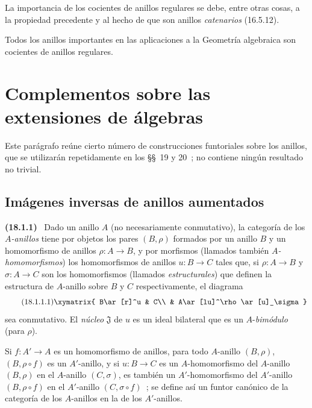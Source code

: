 \documentclass[10pt,oneside]{book}
\makeatletter
\newcommand{\setmanualcurrentlabel}[1]{\def\@currentlabel{#1}}
\newcommand{\oldpage}[2][]{%
  \setcounter{footnote}{0}%
  \marginpar{\scriptsize\textbf{#1}~|~#2}\ignorespaces}
\newenvironment{env}[1][]{\setmanualcurrentlabel{#1}\par\medskip\noindent\textbf{(#1)}\ }{\par}
\makeatother
\begin{document}
La importancia de los cocientes de anillos regulares se debe, entre otras
cosas, a la propiedad precedente y al hecho de que son anillos
\emph{catenarios} (16.5.12).

Todos los anillos importantes en las aplicaciones a la Geometría algebraica
son cocientes de anillos regulares.

\section{Complementos sobre las extensiones de álgebras}
\label{section:0.18-es}

Este parágrafo reúne cierto número de construcciones funtoriales sobre
los anillos, que se utilizarán repetidamente en los \S\S~19 y 20~; no
contiene ningún resultado no trivial.

\subsection{Imágenes inversas de anillos aumentados}
\label{subsection:0.18.1-es}

\begin{env}[18.1.1]
\label{0.18.1.1-es}
Dado un anillo $A$ (no necesariamente conmutativo), la categoría de los
\emph{$A$-anillos} tiene por objetos los pares $(B,\rho)$ formados por un anillo
$B$ y un homomorfismo de anillos $\rho:A\to B$, y por morfismos (llamados también
\emph{$A$-homomorfismos}) los homomorfismos de anillos $u:B\to C$ tales que,
si $\rho:A\to B$ y $\sigma:A\to C$ son los homomorfismos (llamados
\emph{estructurales}) que definen la estructura de $A$-anillo sobre $B$ y $C$
respectivamente, el diagrama
\begin{equation}
\label{0.18.1.1.1-es}
\tag{18.1.1.1}
  \xymatrix{
    B\ar[r]^u & C\\
    & A\ar[lu]^\rho\ar[u]_\sigma
  }
\end{equation}
sea conmutativo. El \emph{núcleo} $\mathfrak{J}$ de $u$ es un ideal bilateral
que es un $A$-\emph{bimódulo} (para $\rho$).

Si $f:A'\to A$ es un homomorfismo de anillos, para todo $A$-anillo
$(B,\rho)$, $(B,\rho\circ f)$ es un $A'$-anillo, y si $u:B\to C$ es un
$A$-homomorfismo del $A$-anillo $(B,\rho)$
\oldpage[0\textsubscript{IV-1}]{52}
en el $A$-anillo $(C,\sigma)$, es también un $A'$-homomorfismo del
$A'$-anillo $(B,\rho\circ f)$ en el $A'$-anillo $(C,\sigma\circ f)$~; se
define así un funtor canónico de la categoría de los $A$-anillos en la de
los $A'$-anillos.
\end{env}
\end{document}
